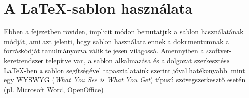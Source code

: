 \chapter{A \LaTeX-sablon használata}

Ebben a fejezetben röviden, implicit módon bemutatjuk a sablon használatának módját, ami azt jelenti, hogy sablon használata ennek a dokumentumnak a forráskódját tanulmányozva válik teljesen világossá. Amennyiben a szoftver-keretrendszer telepítve van, a sablon alkalmazása és a dolgozat szerkesztése \LaTeX-ben a sablon segítségével tapasztalataink szerint jóval hatékonyabb, mint egy WYSWYG (\emph{What You See is What You Get}) típusú szövegszerkesztő esetén (pl. Microsoft Word, OpenOffice).








